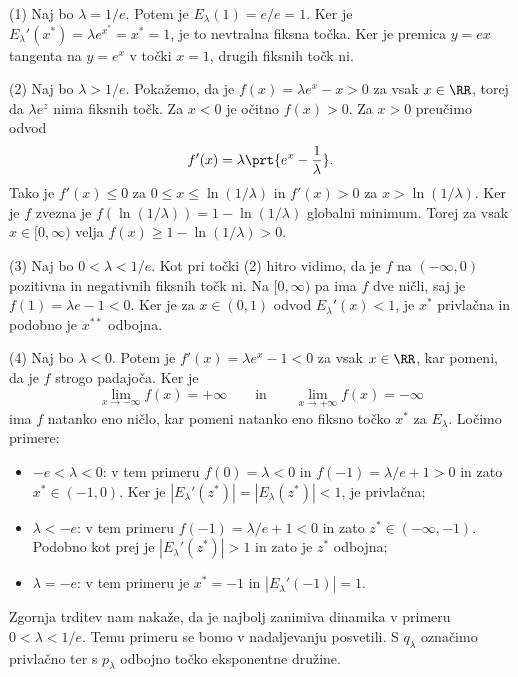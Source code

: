 \begin{dokaz}
    (1) Naj bo \(\lambda = 1/e\). Potem je \(E_\lambda (1) = e/e = 1\). Ker je \(E_\lambda' (x^*) = \lambda e^{x^*} = x^* = 1\), je to nevtralna fiksna točka. Ker je premica \(y = ex\) tangenta na \(y = e^x\) v točki \(x = 1\), drugih fiksnih točk ni.

    (2) Naj bo \(\lambda > 1/e\). Pokažemo, da je \(f (x) = \lambda e^x - x > 0\) za vsak \(x \in \RR\), torej da \(\lambda e^z\) nima fiksnih točk. Za \(x < 0\) je očitno \(f (x) > 0\). Za \(x > 0\) preučimo odvod
    \[f' (x) = \lambda \prt{e^x - \frac{1}{\lambda}}.\]
    Tako je \(f' (x) \leq 0\) za \(0 \leq x \leq \ln (1 / \lambda)\) in \(f' (x) > 0\) za \(x > \ln (1 / \lambda)\). Ker je \(f\) zvezna je \(f (\ln(1/\lambda)) = 1 - \ln (1 / \lambda)\) globalni minimum. Torej za vsak \(x \in [0, \infty)\) velja \(f (x) \geq 1 - \ln (1 / \lambda) > 0\).

    (3) Naj bo \(0 < \lambda < 1/e\). Kot pri točki (2) hitro vidimo, da je \(f\) na \((- \infty, 0)\) pozitivna in negativnih fiksnih točk ni. Na \([0, \infty)\) pa ima \(f\) dve ničli, saj je \(f (1) = \lambda e - 1 < 0\). Ker je za \(x \in (0, 1)\) odvod \(E_\lambda' (x) < 1\), je \(x^*\) privlačna in podobno je \(x^{**}\) odbojna.

    (4) Naj bo \(\lambda < 0\). Potem je \(f' (x) = \lambda e^x - 1 < 0\) za vsak \(x \in \RR\), kar pomeni, da je \(f\) strogo padajoča. Ker je
    \[\lim_{x \to - \infty} f (x) = + \infty \qquad \text{in} \qquad \lim_{x \to + \infty} f (x) = - \infty\]
    ima \(f\) natanko eno ničlo, kar pomeni natanko eno fiksno točko \(x^*\) za \(E_\lambda\). Ločimo primere:
    \begin{itemize}
        \item \(-e < \lambda < 0\): v tem primeru \(f (0) = \lambda < 0\) in \(f (-1) = \lambda / e + 1 > 0\) in zato \(x^* \in (-1, 0)\). Ker je \(|E_\lambda' (z^*)| = |E_\lambda (z^*)| < 1\), je privlačna;
        \item \(\lambda < -e\): v tem primeru \(f (-1) = \lambda / e + 1 < 0\) in zato \(z^* \in (- \infty, -1)\). Podobno kot prej je \(|E_\lambda' (z^*)| > 1\) in zato je \(z^*\) odbojna;
        \item \(\lambda = - e\): v tem primeru je \(x^* = -1\) in \(|E_\lambda' (-1)| = 1\).
    \end{itemize}
\end{dokaz}

\noindent Zgornja trditev nam nakaže, da je najbolj zanimiva dinamika v primeru \(0 < \lambda < 1/e\). Temu primeru se bomo v nadaljevanju posvetili. S \(q_\lambda\) označimo privlačno ter s \(p_\lambda\) odbojno točko eksponentne družine.

